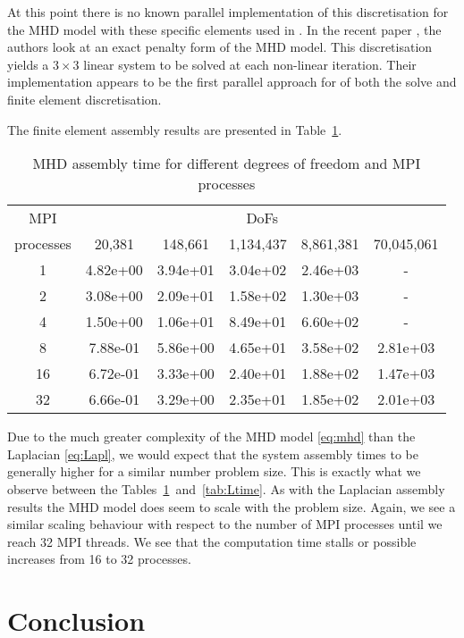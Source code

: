 \documentclass[10pt]{article}
\begin{document}
At this point there is no known parallel implementation of this discretisation for the MHD model with these specific elements used in \cite{schotzau2004mixed}. In the recent paper \cite{phillips2014block}, the authors look at an exact penalty form of the MHD model. This discretisation yields a $3\times3$ linear system to be solved at each non-linear iteration. Their implementation appears to be the first parallel approach for of both the solve and finite element discretisation.

The finite element assembly results are presented in Table~\ref{tab:MHD}.
\begin{table}[h!]
    \centering
    \begin{tabular}{|c|ccccc|}
        \hline
        MPI & \multicolumn{5}{c|}{DoFs}\\
        processes &  20,381   &   148,661  &   1,134,437  &   8,861,381  & 70,045,061 \\
        \hline
        1 & 4.82e+00 &  3.94e+01 &  3.04e+02 &  2.46e+03 &  - \\
        2 & 3.08e+00 &  2.09e+01 &  1.58e+02 &  1.30e+03 &  - \\
        4 & 1.50e+00 &  1.06e+01 &  8.49e+01 &  6.60e+02 &  - \\
        8 & 7.88e-01 &  5.86e+00 &  4.65e+01 &  3.58e+02 &  2.81e+03 \\
        16 & 6.72e-01 &  3.33e+00 &  2.40e+01 &  1.88e+02 &  1.47e+03 \\
        32 & 6.66e-01 &  3.29e+00 &  2.35e+01 &  1.85e+02 &  2.01e+03 \\
        \hline
    \end{tabular}
    \caption{MHD assembly time for different degrees of freedom and MPI processes}
    \label{tab:MHD}
\end{table}
Due to the much greater complexity of the MHD model \eqref{eq:mhd} than the Laplacian \eqref{eq:Lapl}, we would expect that the system assembly times to be generally higher for a similar number problem size. This is exactly what we observe between the Tables~\ref{tab:MHD}~and~\ref{tab:Ltime}. As with the Laplacian assembly results the MHD model does seem to scale with the problem size. Again, we see a similar scaling behaviour with respect to the number of MPI processes until we reach 32 MPI threads. We see that the computation time stalls or possible increases from 16 to 32 processes.

\section{Conclusion}
\end{document}
